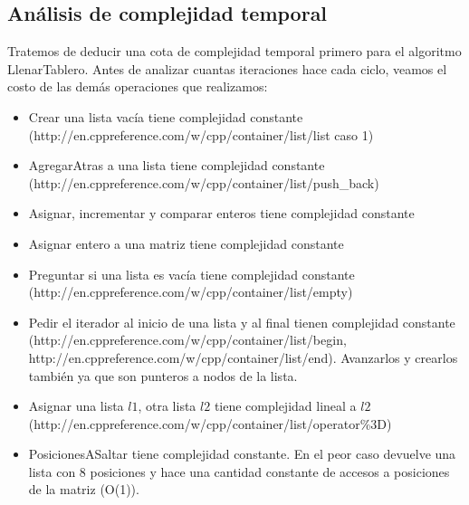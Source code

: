 \documentclass[a4paper]{article}
\begin{document}
\subsection{Análisis de complejidad temporal}
Tratemos de deducir una cota de complejidad temporal primero para el algoritmo LlenarTablero.
\newline Antes de analizar cuantas iteraciones hace cada ciclo, veamos el costo de las demás operaciones que realizamos:
\begin{itemize}
\item Crear una lista vacía tiene complejidad constante \newline (http://en.cppreference.com/w/cpp/container/list/list caso 1)
\item AgregarAtras a una lista tiene complejidad constante 
\newline (http://en.cppreference.com/w/cpp/container/list/push\_back)
\item Asignar, incrementar y comparar enteros tiene complejidad constante
\item Asignar entero a una matriz tiene complejidad constante
\item Preguntar si una lista es vacía tiene complejidad constante \newline (http://en.cppreference.com/w/cpp/container/list/empty)
\item Pedir el iterador al inicio de una lista y al final tienen complejidad constante \newline (http://en.cppreference.com/w/cpp/container/list/begin, http://en.cppreference.com/w/cpp/container/list/end). Avanzarlos y crearlos también ya que son punteros a nodos de la lista. 
\item Asignar una lista $l1$, otra lista $l2$ tiene complejidad lineal a $l2$ \newline (http://en.cppreference.com/w/cpp/container/list/operator\%3D)
\item PosicionesASaltar tiene complejidad constante. En el peor caso devuelve una lista con 8 posiciones y hace una cantidad constante de accesos a posiciones de la matriz (O(1)).
\end{itemize}
\end{document}
